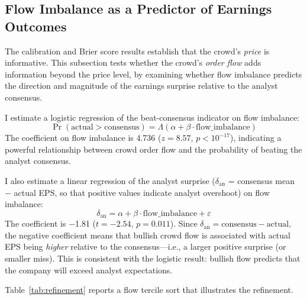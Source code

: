 \documentclass[11pt]{article}
\begin{document}
\subsection{Flow Imbalance as a Predictor of Earnings Outcomes}

The calibration and Brier score results establish that the crowd's \textit{price} is informative. This subsection tests whether the crowd's \textit{order flow} adds information beyond the price level, by examining whether flow imbalance predicts the direction and magnitude of the earnings surprise relative to the analyst consensus.

I estimate a logistic regression of the beat-consensus indicator on flow imbalance:
\begin{equation}
\Pr(\text{actual} > \text{consensus}) = \Lambda(\alpha + \beta \cdot \text{flow\_imbalance})
\end{equation}
The coefficient on flow imbalance is 4.736 ($z = 8.57$, $p < 10^{-17}$), indicating a powerful relationship between crowd order flow and the probability of beating the analyst consensus.

I also estimate a linear regression of the analyst surprise ($\delta_{\text{an}}$ = consensus mean $-$ actual EPS, so that positive values indicate analyst overshoot) on flow imbalance:
\begin{equation}
\delta_{\text{an}} = \alpha + \beta \cdot \text{flow\_imbalance} + \varepsilon
\end{equation}
The coefficient is $-$1.81 ($t = -2.54$, $p = 0.011$). Since $\delta_{\text{an}} = \text{consensus} - \text{actual}$, the negative coefficient means that bullish crowd flow is associated with actual EPS being \textit{higher} relative to the consensus---i.e., a larger positive surprise (or smaller miss). This is consistent with the logistic result: bullish flow predicts that the company will exceed analyst expectations.

Table~\ref{tab:refinement} reports a flow tercile sort that illustrates the refinement.
\end{document}
